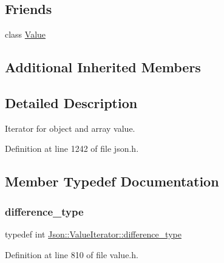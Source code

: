 \subsection*{Friends}
\begin{DoxyCompactItemize}
\item 
class \hyperlink{class_json_1_1_value_iterator_a896c037a32087c5c20d97e64a1786880}{Value}
\end{DoxyCompactItemize}
\subsection*{Additional Inherited Members}


\subsection{Detailed Description}
Iterator for object and array value. 

Definition at line 1242 of file json.\+h.



\subsection{Member Typedef Documentation}
\hypertarget{class_json_1_1_value_iterator_a2be1a9aa60bbfc8812e9dd1a7f1a8786}{}\label{class_json_1_1_value_iterator_a2be1a9aa60bbfc8812e9dd1a7f1a8786} 
\subsubsection{\texorpdfstring{difference\+\_\+type}{difference\_type}\hspace{0.1cm}{\footnotesize\ttfamily [1/2]}}
{\footnotesize\ttfamily typedef int \hyperlink{class_json_1_1_value_iterator_a2be1a9aa60bbfc8812e9dd1a7f1a8786}{Json\+::\+Value\+Iterator\+::difference\+\_\+type}}



Definition at line 810 of file value.\+h.

\hypertarget{class_json_1_1_value_iterator_a2be1a9aa60bbfc8812e9dd1a7f1a8786}{}\label{class_json_1_1_value_iterator_a2be1a9aa60bbfc8812e9dd1a7f1a8786} 
